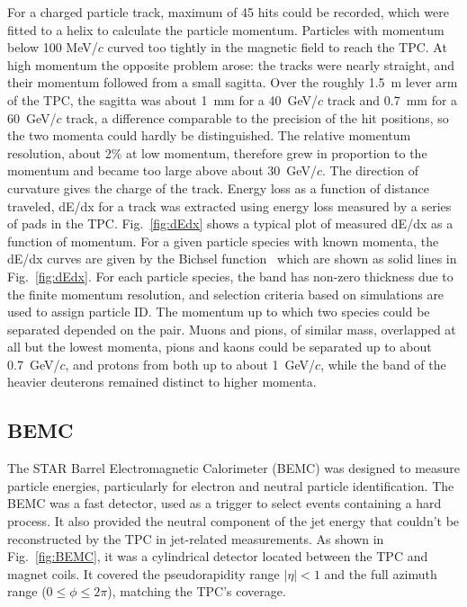 For a charged particle track, maximum of 45 hits could be recorded, which were fitted to a helix to calculate the particle momentum. Particles with momentum below 100 MeV/\(c\) curved too tightly in the magnetic field to reach the TPC. At high momentum the opposite problem arose: the tracks were nearly straight, and their momentum followed from a small sagitta. Over the roughly 1.5~m lever arm of the TPC, the sagitta was about 1~mm for a 40~GeV/\(c\) track and 0.7~mm for a 60~GeV/\(c\) track, a difference comparable to the precision of the hit positions, so the two momenta could hardly be distinguished. The relative momentum resolution, about 2\% at low momentum, therefore grew in proportion to the momentum and became too large above about 30~GeV/\(c\). The direction of curvature gives the charge of the track. Energy loss as a function of distance traveled, dE/dx for a track was extracted using energy loss measured by a series of pads in the TPC. Fig.~\ref{fig:dEdx} shows a typical plot of measured dE/dx as a function of momentum. For a given particle species with known momenta, the dE/dx curves are given by the Bichsel function~\cite{BICHSEL2006154} which are shown as solid lines in Fig.~\ref{fig:dEdx}. For each particle species, the band has non-zero thickness due to the finite momentum resolution, and selection criteria based on simulations are used to assign particle ID. The momentum up to which two species could be separated depended on the pair. Muons and pions, of similar mass, overlapped at all but the lowest momenta, pions and kaons could be separated up to about 0.7~GeV/\(c\), and protons from both up to about 1~GeV/\(c\), while the band of the heavier deuterons remained distinct to higher momenta.

\subsection{BEMC} \label{BEMC}

The STAR Barrel Electromagnetic Calorimeter (BEMC) \cite{BEDDO2003725} was designed to measure particle energies, particularly for electron and neutral particle identification.
%
The BEMC was a fast detector, used as a trigger to select events containing a hard process. 
%
It also provided the neutral component of the jet energy that couldn't be reconstructed by the TPC in jet-related measurements. 
%
As shown in Fig.~\ref{fig:BEMC}, it was a cylindrical detector located between the TPC and magnet coils. 
%
It covered the pseudorapidity range $|\eta| < 1$ and the full azimuth range (\(0 \leq \phi \leq 2\pi\)), matching the TPC's coverage.

